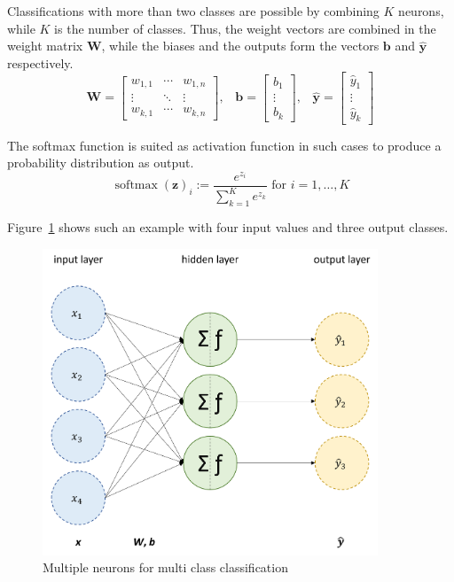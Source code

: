 Classifications with more than two classes are possible by combining $K$ neurons, while $K$ is the number of classes. Thus, the weight vectors are combined in the weight matrix $\mathbf{W}$, while the biases and the outputs form the vectors $\mathbf{b}$ and $\mathbf{\hat{y}}$ respectively.
\begin{equation}
    \mathbf{W} = \begin{bmatrix}w_{1,1}&\cdots &w_{1,n}\\\vdots &\ddots &\vdots\\w_{k,1}&\cdots &w_{k,n}\end{bmatrix}\text{,}\quad\mathbf{b} = \begin{bmatrix}b_1\\\vdots \\b_k\end{bmatrix}\text{,}\quad\mathbf{\hat{y}} = \begin{bmatrix}\hat{y}_1\\\vdots \\\hat{y}_k\end{bmatrix}
\end{equation}

The softmax function is suited as activation function in such cases to produce a probability distribution as output.
\begin{equation}
    \operatorname{softmax}(\mathbf{z})_{i} := {\frac{e^{z_{i}}}{\sum_{k=1}^{K}e^{z_{k}}}}\text{ for }i=1,\dotsc ,K
\end{equation}

Figure~\ref{fig:neurons} shows such an example with four input values and three output classes.

\begin{figure}[H]
    \begin{center}
    \includegraphics[width=10cm]{../images/neurons.png}
    \caption{Multiple neurons for multi class classification}\label{fig:neurons}
    \end{center}
\end{figure}

